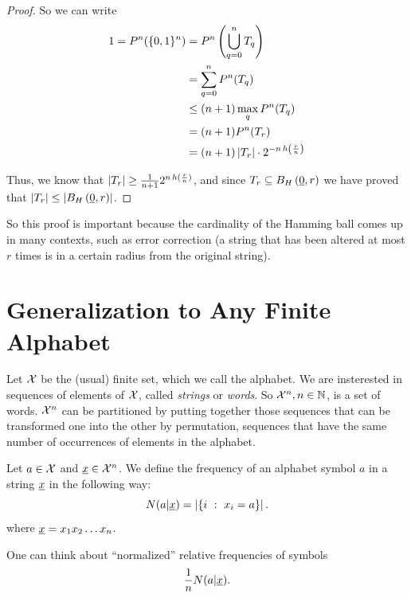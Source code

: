 \begin{proof}
	So we can write
	\begin{align*}
		1
		=
		P^n(\{0,1\}^n)
		& =
		P^n\left(\bigcup_{q=0}^nT_q\right)
		\\
		& =
		\sum_{q=0}^n P^n(T_q)
		\\
		& \le
		(n+1) \max_q P^n(T_q)
		\\
		& =
		(n+1) P^n(T_r)
		\\
		& =
		(n + 1) \left|{T_r}\right| \cdot 2^{-n \, h \left(\frac{r}{n}\right)}
	\end{align*}

	Thus, we know that $\left|{T_r}\right| \ge \frac{1}{n+1} 2^{n \, h(\frac{r}{n})}$, and since $T_r \subseteq B_H\left(\underline{0}, r\right)$ we have proved that $\left|{T_r}\right| \le \left|{B_H\left(\underline{0}, r\right)}\right|$.
\end{proof}

So this proof is important because the cardinality of the Hamming ball comes up in many contexts, such as error correction (a string that has been altered at most $r$ times is in a certain radius from the original string).

\section{Generalization to Any Finite Alphabet}

Let $\mathcal{X}$ be the (usual) finite set, which we call the alphabet.
We are insterested in sequences of elements of $\mathcal{X}$, called \emph{strings} or \emph{words}.
So $\mathcal{X}^n, n \in \mathbb{N}$, is a set of words.
$\mathcal{X}^n$ can be partitioned by putting together those sequences that can be transformed one into the other by permutation, \ie sequences that have the same number of occurrences of elements in the alphabet.

\begin{definition}
	Let $a \in \mathcal{X}$ and $\underline{x} \in \mathcal{X}^n$.
	We define the frequency of an alphabet symbol $a$ in a string $\underline{x}$ in the following way:  
	\begin{equation*}
	N(a | \underline{x}) = \left|{\{i\ :\ x_i = a\}}\right|.
	\end{equation*}
	where $\underline{x} = x_1 x_2 \ldots x_n$.
\end{definition}

One can think about ``normalized'' relative frequencies of symbols
\begin{equation*}
	\frac{1}{n} N(a|\underline{x}).
\end{equation*}

